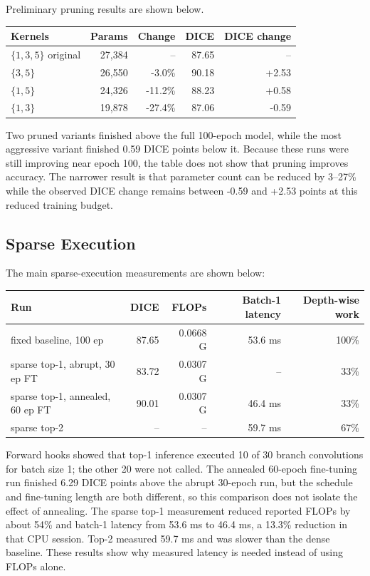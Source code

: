 \documentclass[10pt,a4paper]{article}
\begin{document}
Preliminary pruning results are shown below.

\begin{center}\small
\begin{tabular}{@{}lrrrr@{}}
\toprule
Kernels & Params & Change & DICE & DICE change \\
\midrule
$\{1,3,5\}$ original & 27{,}384 & -- & 87.65 & -- \\
$\{3,5\}$ & 26{,}550 & -3.0\% & 90.18 & +2.53 \\
$\{1,5\}$ & 24{,}326 & -11.2\% & 88.23 & +0.58 \\
$\{1,3\}$ & 19{,}878 & -27.4\% & 87.06 & -0.59 \\
\bottomrule
\end{tabular}
\end{center}

Two pruned variants finished above the full 100-epoch model, while the most aggressive variant finished 0.59 DICE points below it. Because these runs were still improving near epoch 100, the table does not show that pruning improves accuracy. The narrower result is that parameter count can be reduced by 3--27\% while the observed DICE change remains between -0.59 and +2.53 points at this reduced training budget.

\subsection{Sparse Execution}

The main sparse-execution measurements are shown below:

\begin{center}\small
\begin{tabular}{@{}lrrrr@{}}
\toprule
Run & DICE & FLOPs & Batch-1 latency & Depth-wise work \\
\midrule
fixed baseline, 100 ep & 87.65 & 0.0668 G & 53.6 ms & 100\% \\
sparse top-1, abrupt, 30 ep FT & 83.72 & 0.0307 G & -- & 33\% \\
sparse top-1, annealed, 60 ep FT & 90.01 & 0.0307 G & 46.4 ms & 33\% \\
sparse top-2 & -- & -- & 59.7 ms & 67\% \\
\bottomrule
\end{tabular}
\end{center}

Forward hooks showed that top-1 inference executed 10 of 30 branch convolutions for batch size 1; the other 20 were not called. The annealed 60-epoch fine-tuning run finished 6.29 DICE points above the abrupt 30-epoch run, but the schedule and fine-tuning length are both different, so this comparison does not isolate the effect of annealing. The sparse top-1 measurement reduced reported FLOPs by about 54\% and batch-1 latency from 53.6 ms to 46.4 ms, a 13.3\% reduction in that CPU session. Top-2 measured 59.7 ms and was slower than the dense baseline. These results show why measured latency is needed instead of using FLOPs alone.
\end{document}
